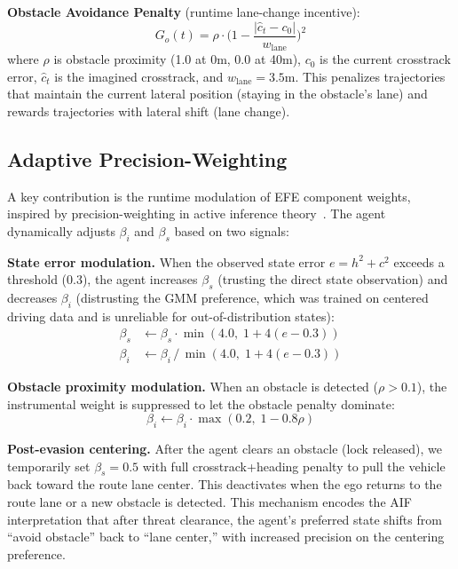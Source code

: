 \documentclass[conference]{IEEEtran}
\begin{document}
\textbf{Obstacle Avoidance Penalty} (runtime lane-change incentive):
\begin{equation}
    G_o(t) = \rho \cdot \Big(1 - \frac{|\hat{c}_t - c_0|}{w_{\text{lane}}}\Big)^2
\end{equation}
where $\rho$ is obstacle proximity (1.0 at 0m, 0.0 at 40m), $c_0$ is the current crosstrack error, $\hat{c}_t$ is the imagined crosstrack, and $w_{\text{lane}} = 3.5$m. This penalizes trajectories that maintain the current lateral position (staying in the obstacle's lane) and rewards trajectories with lateral shift (lane change).

\subsection{Adaptive Precision-Weighting}

A key contribution is the runtime modulation of EFE component weights, inspired by precision-weighting in active inference theory~\cite{parr2022active}. The agent dynamically adjusts $\beta_i$ and $\beta_s$ based on two signals:

\textbf{State error modulation.} When the observed state error $e = h^2 + c^2$ exceeds a threshold (0.3), the agent increases $\beta_s$ (trusting the direct state observation) and decreases $\beta_i$ (distrusting the GMM preference, which was trained on centered driving data and is unreliable for out-of-distribution states):
\begin{align}
    \beta_s &\leftarrow \beta_s \cdot \min(4.0, \; 1 + 4(e - 0.3)) \\
    \beta_i &\leftarrow \beta_i \, / \, \min(4.0, \; 1 + 4(e - 0.3))
\end{align}

\textbf{Obstacle proximity modulation.} When an obstacle is detected ($\rho > 0.1$), the instrumental weight is suppressed to let the obstacle penalty dominate:
\begin{equation}
    \beta_i \leftarrow \beta_i \cdot \max(0.2, \; 1 - 0.8\rho)
\end{equation}

\textbf{Post-evasion centering.} After the agent clears an obstacle (lock released), we temporarily set $\beta_s = 0.5$ with full crosstrack+heading penalty to pull the vehicle back toward the route lane center. This deactivates when the ego returns to the route lane or a new obstacle is detected. This mechanism encodes the AIF interpretation that after threat clearance, the agent's preferred state shifts from ``avoid obstacle'' back to ``lane center,'' with increased precision on the centering preference.
\end{document}
